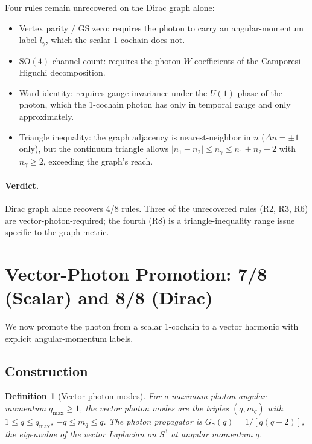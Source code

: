 \documentclass[11pt]{article}
\newtheorem{definition}{Definition}
\begin{document}
Four rules remain unrecovered on the Dirac graph alone:

\begin{itemize}\setlength{\itemsep}{2pt}
\item[(\textbf{R2})] Vertex parity / GS zero: requires the photon to
carry an angular-momentum label $l_\gamma$, which the scalar
1-cochain does not.
\item[(\textbf{R3})] $\mathrm{SO}(4)$ channel count: requires the
photon $W$-coefficients of the Camporesi--Higuchi decomposition.
\item[(\textbf{R6})] Ward identity: requires gauge invariance under
the $U(1)$ phase of the photon, which the 1-cochain photon has only
in temporal gauge and only approximately.
\item[(\textbf{R8})] Triangle inequality: the graph adjacency is
nearest-neighbor in $n$ ($\Delta n = \pm 1$ only), but the continuum
triangle allows $|n_1 - n_2| \le n_\gamma \le n_1 + n_2 - 2$ with
$n_\gamma \ge 2$, exceeding the graph's reach.
\end{itemize}

\paragraph{Verdict.}  Dirac graph alone recovers 4/8 rules.  Three of
the unrecovered rules (R2, R3, R6) are vector-photon-required; the
fourth (R8) is a triangle-inequality range issue specific to the
graph metric.

\section{Vector-Photon Promotion: 7/8 (Scalar) and 8/8 (Dirac)}
\label{sec:vector_photon}

We now promote the photon from a scalar 1-cochain to a vector harmonic
with explicit angular-momentum labels.

\subsection{Construction}

\begin{definition}[Vector photon modes]
\label{def:vector_photon}
For a maximum photon angular momentum $q_{\max} \ge 1$, the vector
photon modes are the triples $(q, m_q)$ with $1 \le q \le q_{\max}$,
$-q \le m_q \le q$.  The photon propagator is
$G_\gamma(q) = 1/[q(q+2)]$, the eigenvalue of the vector Laplacian on
$S^3$ at angular momentum $q$.
\end{definition}
\end{document}

